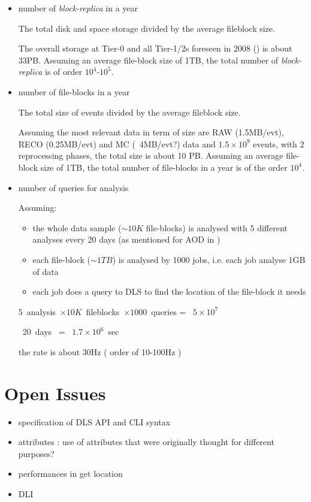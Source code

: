 \documentclass[pdftex]{cmspaper}
\begin{document}
\begin{itemize}

\item number of {\em block-replica} in a year

  The total disk and space storage divided by the average fileblock size.

  The overall storage at Tier-0 and all Tier-1/2s foreseen in 2008 (\cite{CTDR})  is about 33PB. Assuming an average file-block size of 1TB, the
  total number of {\em block-replica} is of order $10^{4}$-$10^{5}$.

\item number of file-blocks in a year

  The total size of events divided by the average fileblock size.

  Assuming the most relevant data in term of size are RAW (1.5MB/evt),
  RECO (0.25MB/evt) and MC (~4MB/evt?) data and $1.5 \times 10^{9}$ events,
  with 2 reprocessing phases, the total size is about 10 PB.
  Assuming an average file-block size of 1TB, the
  total number of file-blocks in a year is of the order $10^{4}$.

%
\item number of queries for analysis

 Assuming:
 \begin{itemize}
  \item the whole data sample ($\sim 10K$ file-blocks) is analysed
        with 5 different analyses every 20 days (as mentioned for AOD in \cite{CM})
  \item each file-block ($\sim 1TB$) is analysed by 1000 jobs, i.e. each job
        analyse 1GB of data
  \item each job does a query to DLS to find the location of the file-block it needs
 \end{itemize}

 \mbox{5 analysis $\times 10K$ fileblocks $\times 1000$ queries} = \mbox{ $5 \times 10^{7}$ }

 \mbox{ 20 days } = \mbox{ $1.7 \times 10^{6}$ sec}

 the rate is about 30Hz ( order of 10-100Hz )

\end{itemize}

\section{Open Issues}
\begin{itemize}
 \item specification of DLS API and CLI syntax
 \item attributes : use of attributes that were originally thought for different purposes?
 \item performances in get location
 \item DLI 
\end{itemize}  
\end{document}
